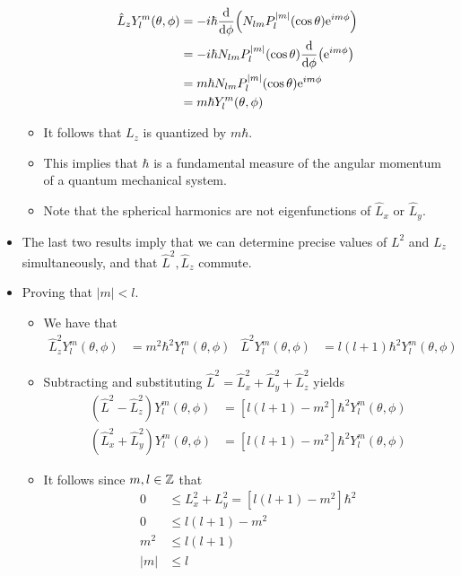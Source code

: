 \documentclass[../notes.tex]{subfiles}
\begin{document}
\begin{itemize}
    \begin{align*}
        \hat{L}_zY_l^m(\theta,\phi) &= -i\hbar\dv{\phi}(N_{lm}P_l^{|m|}(\cos\theta)\e[im\phi])\\
        &= -i\hbar N_{lm}P_l^{|m|}(\cos\theta)\dv{\phi}(\e[im\phi])\\
        &= m\hbar N_{lm}P_l^{|m|}(\cos\theta)\e[im\phi]\\
        &= m\hbar Y_l^m(\theta,\phi)
    \end{align*}
    \begin{itemize}
        \item It follows that $L_z$ is quantized by $m\hbar$.
        \item This implies that $\hbar$ is a fundamental measure of the angular momentum of a quantum mechanical system.
        \item Note that the spherical harmonics are not eigenfunctions of $\hat{L}_x$ or $\hat{L}_y$.
    \end{itemize}
    \item The last two results imply that we can determine precise values of $L^2$ and $L_z$ simultaneously, and that $\hat{L}^2,\hat{L}_z$ commute.
    \item Proving that $|m|<l$.
    \begin{itemize}
        \item We have that
        \begin{align*}
            \hat{L}_z^2Y_l^m(\theta,\phi) &= m^2\hbar^2Y_l^m(\theta,\phi)&
            \hat{L}^2Y_l^m(\theta,\phi) &= l(l+1)\hbar^2Y_l^m(\theta,\phi)
        \end{align*}
        \item Subtracting and substituting $\hat{L}^2=\hat{L}_x^2+\hat{L}_y^2+\hat{L}_z^2$ yields
        \begin{align*}
            (\hat{L}^2-\hat{L}_z^2)Y_l^m(\theta,\phi) &= [l(l+1)-m^2]\hbar^2Y_l^m(\theta,\phi)\\
            (\hat{L}_x^2+\hat{L}_y^2)Y_l^m(\theta,\phi) &= [l(l+1)-m^2]\hbar^2Y_l^m(\theta,\phi)
        \end{align*}
        \item It follows since $m,l\in\Z$ that
        \begin{align*}
            0 &\leq L_x^2+L_y^2 = [l(l+1)-m^2]\hbar^2\\
            0 &\leq l(l+1)-m^2\\
            m^2 &\leq l(l+1)\\
            |m| &\leq l
        \end{align*}

\end{itemize}
\end{itemize}
\end{document}
